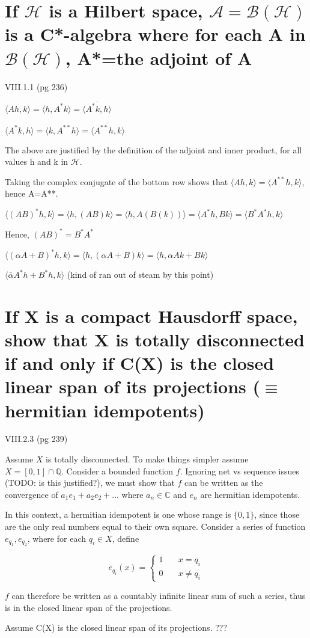 \documentclass{article}
\begin{document}
\section{If $\mathscr{H}$ is a Hilbert space, $\mathscr{A}=\mathscr{B}(\mathscr{H} )$ is a C*-algebra where for each A in $\mathscr{B}(\mathscr{H} )$, A*=the adjoint of A}

VIII.1.1 (pg 236)

$\langle Ah, k \rangle = \langle h, A^*k \rangle = \overline{ \langle A^*k,h \rangle}$

$\langle A^*k, h \rangle = \langle k, A^{**}h \rangle = \overline{\langle A^{**}h,k \rangle}$

The above are justified by the definition of the adjoint and inner product, for all values h and k in $\mathscr{H}$.

Taking the complex conjugate of the bottom row shows that $\langle Ah, k \rangle = \langle A^{**}h,k \rangle$, hence A=A**.

$\langle (AB)^*h, k \rangle = \langle h, (AB)k \rangle = \langle h, A(B(k)) \rangle = \langle A^* h, B k \rangle = \langle B^*A^*h,k \rangle$

Hence, $(AB)^* = B^*A^*$

$\langle (\alpha A + B)^*h,k \rangle = \langle h, (\alpha A + B) k \rangle = \langle h, \alpha A k + B k \rangle$

$\langle \bar{\alpha}A^*h+B^*h, k \rangle$ (kind of ran out of steam by this point)


\section{If X is a compact Hausdorff space, show that X is totally disconnected if and only if C(X) is the closed linear span of its projections ($\equiv$ hermitian idempotents)}

VIII.2.3 (pg 239)

Assume $X$ is totally disconnected. To make things simpler assume $X=[0,1] \cap \mathbb{Q}$. Consider a bounded function $f$. Ignoring net vs sequence issues (TODO: is this justified?), we must show that $f$ can be written as the convergence of $a_1 e_1 + a_2 e_2 + ... $ where $a_n \in \mathbb{C}$ and $e_n$ are hermitian idempotents.

In this context, a hermitian idempotent is one whose range is $\{0,1\}$, since those are the only real numbers equal to their own square. Consider a series of function $e_{q_1}, e_{q_2}$, where for each ${q_i} \in X$, define

\begin{equation*}
e_{q_i}(x)= \left\{
        \begin{array}{ll}
            1 & \quad x = q_i \\
            0 & \quad x \ne q_i
        \end{array}
    \right.
\end{equation*}

$f$ can therefore be written as a countably infinite linear sum of such a series, thus is in the closed linear span of the projections.

Assume C(X) is the closed linear span of its projections. ???
\end{document}

